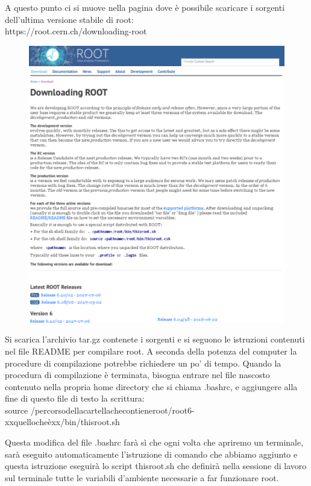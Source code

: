 \documentclass[11pt,fleqn]{book} %
\begin{document}
A questo punto ci si muove nella pagina dove è possibile scaricare i sorgenti dell'ultima versione stabile di root:\\
https://root.cern.ch/downloading-root\\
\begin{figure}[h]
\centering
\includegraphics[scale=0.3]{./Pictures/download.pdf}
\end{figure}
Si scarica l'archivio tar.gz contenete i sorgenti e si seguono le istruzioni contenuti nel file README per compilare root. A seconda della potenza del computer la procedure di compilazione potrebbe richiedere un po' di tempo. Quando la procedura di compilazione è terminata, bisogna entrare nel file nascosto contenuto nella propria home directory che si chiama .bashrc, e aggiungere alla fine di questo file di testo la scrittura:\\
source /percorsodellacartellachecontieneroot/root6-xxquellocheèxx/bin/thisroot.sh

Questa modifica del file .bashrc farà sì che ogni volta che apriremo un terminale, sarà eseguito automaticamente l'istruzione di comando che abbiamo aggiunto e questa istruzione eseguirà lo script thisroot.sh che definirà nella sessione di lavoro sul terminale tutte le variabili d'ambiente necessarie a far funzionare root.
\end{document}
